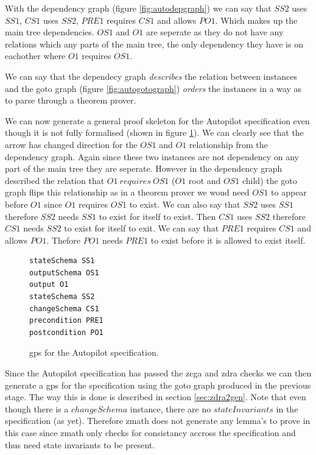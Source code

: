 With the dependency graph (figure \ref{fig:autodepgraph}) we can say that $SS2$ uses $SS1$, $CS1$ uses $SS2$, $PRE1$ requires $CS1$ and allows $PO1$. Which makes up the main tree dependencies. $OS1$ and $O1$ are seperate as they do not have any relations which any parts of the main tree, the only dependency they have is on eachother where $O1$ requires $OS1$.

We can say that the dependecy graph \emph{describes} the relation between instances and the goto graph (figure \ref{fig:autogotograph}) \emph{orders} the instances in a way as to parse through a theorem prover.

We can now generate a general proof skeleton for the Autopilot specification even though it is not fully formalised (shown in figure \ref{fig:autopilotgps}). We can clearly see that the arrow has changed direction for the $OS1$ and $O1$ relationship from the dependency graph. Again since these two instances are not dependency on any part of the main tree they are seperate. However in the dependency graph described the relation that $O1\ requires\ OS1$ ($O1$ root and $OS1$ child) the goto graph flips this relationship as in a theorem prover we woud need $OS1$ to appear before $O1$ since $O1$ requires $OS1$ to exist. We can also say that $SS2$ uses $SS1$ therefore $SS2$ needs $SS1$ to exist for itself to exist. Then $CS1$ uses $SS2$ therefore $CS1$ needs $SS2$ to exist for itself to exit. We can say that $PRE1$ requires $CS1$ and allows $PO1$. Thefore $PO1$ needs $PRE1$ to exist before it is allowed to exist itself.

\begin{figure}[H]
\centering
\begin{center}
\begin{verbatim}
stateSchema SS1 
outputSchema OS1 
output O1 
stateSchema SS2 
changeSchema CS1 
precondition PRE1 
postcondition PO1 
\end{verbatim}
\end{center}
\caption{\Gls{gps} for the Autopilot specification. \label{fig:autopilotgps}}
\end{figure}

Since the Autopilot specification has passed the \gls{zcga} and \gls{zdra} checks we can then generate a \gls{gps} for the specification using the goto graph produced in the previous stage. The way this is done is described in section \ref{sec:zdra2gen}. Note that even though there is a $changeSchema$ instance, there are no $stateInvariants$ in the specification (as yet). Therefore \gls{zmath} does not generate any lemma's to prove in this case since \gls{zmath} only checks for consistancy accross the specification and thus need state invariants to be present.

